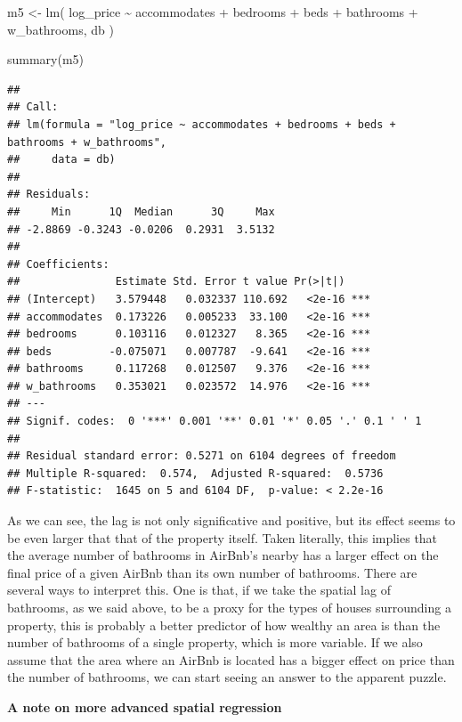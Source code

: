 \documentclass[
]{book}
\newenvironment{Shaded}{\begin{snugshade}}{\end{snugshade}}
\newcommand{\FunctionTok}[1]{\textcolor[rgb]{0.00,0.00,0.00}{#1}}
\newcommand{\NormalTok}[1]{#1}
\newcommand{\OtherTok}[1]{\textcolor[rgb]{0.56,0.35,0.01}{#1}}
\newcommand{\StringTok}[1]{\textcolor[rgb]{0.31,0.60,0.02}{#1}}
\begin{document}
\begin{Shaded}
\begin{Highlighting}[]
\NormalTok{m5 }\OtherTok{\textless{}{-}} \FunctionTok{lm}\NormalTok{(}
  \StringTok{\textquotesingle{}log\_price \textasciitilde{} accommodates + bedrooms + beds + bathrooms + w\_bathrooms\textquotesingle{}}\NormalTok{,}
\NormalTok{  db}
\NormalTok{)}

\FunctionTok{summary}\NormalTok{(m5)}
\end{Highlighting}
\end{Shaded}

\begin{verbatim}
## 
## Call:
## lm(formula = "log_price ~ accommodates + bedrooms + beds + bathrooms + w_bathrooms", 
##     data = db)
## 
## Residuals:
##     Min      1Q  Median      3Q     Max 
## -2.8869 -0.3243 -0.0206  0.2931  3.5132 
## 
## Coefficients:
##               Estimate Std. Error t value Pr(>|t|)    
## (Intercept)   3.579448   0.032337 110.692   <2e-16 ***
## accommodates  0.173226   0.005233  33.100   <2e-16 ***
## bedrooms      0.103116   0.012327   8.365   <2e-16 ***
## beds         -0.075071   0.007787  -9.641   <2e-16 ***
## bathrooms     0.117268   0.012507   9.376   <2e-16 ***
## w_bathrooms   0.353021   0.023572  14.976   <2e-16 ***
## ---
## Signif. codes:  0 '***' 0.001 '**' 0.01 '*' 0.05 '.' 0.1 ' ' 1
## 
## Residual standard error: 0.5271 on 6104 degrees of freedom
## Multiple R-squared:  0.574,  Adjusted R-squared:  0.5736 
## F-statistic:  1645 on 5 and 6104 DF,  p-value: < 2.2e-16
\end{verbatim}

As we can see, the lag is not only significative and positive, but its effect seems to be even larger that that of the property itself. Taken literally, this implies that the average number of bathrooms in AirBnb's nearby has a larger effect on the final price of a given AirBnb than its own number of bathrooms. There are several ways to interpret this. One is that, if we take the spatial lag of bathrooms, as we said above, to be a proxy for the types of houses surrounding a property, this is probably a better predictor of how wealthy an area is than the number of bathrooms of a single property, which is more variable. If we also assume that the area where an AirBnb is located has a bigger effect on price than the number of bathrooms, we can start seeing an answer to the apparent puzzle.

\textbf{A note on more advanced spatial regression}
\end{document}
